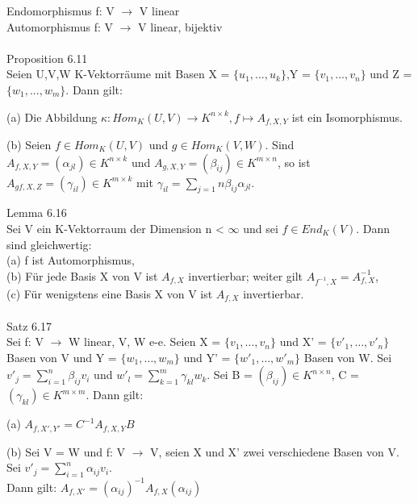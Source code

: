\documentclass[fontsize=10pt]{scrartcl}
\begin{document}
Endomorphismus \hspace*{3.5mm} f: V $\to$ V \hspace*{4mm} linear\\
Automorphismus \hspace*{4mm} f: V $\to$ V \hspace*{4mm} linear, bijektiv\\
\\
Proposition 6.11\\
Seien U,V,W K-Vektorräume mit Basen X = $\{u_1,...,u_k\}$,Y = $\{v_1,...,v_n\}$ und Z = $\{w_1,...,w_m\}$. Dann gilt:
\begin{compactenum}
\item[(a)] Die Abbildung $\kappa: Hom_K(U,V) \to K^{n \times k}, f \mapsto A_{f,X,Y}$ ist ein Isomorphismus.
\item[(b)] Seien $f \in Hom_K(U,V)$ und $g \in Hom_K(V,W)$. Sind $A_{f,X,Y} = (\alpha_{jl}) \in K^{n \times k}$ und $A_{g,X,Y} = (\beta_{ij}) \in K^{m \times n}$, so ist $A_{gf,X,Z} = (\gamma_{il}) \in K^{m \times k}$ mit
$\gamma_{il} = \sum\nolimits_{j=1}{n} \beta_{ij} \alpha_{jl}$.\\
\end{compactenum}
Lemma 6.16\\
Sei V ein K-Vektorraum der Dimension n < $\infty$ und sei $f \in End_K (V)$. Dann sind gleichwertig:\\
(a) f ist Automorphismus,\\
(b) Für jede Basis X von V ist $A_{f,X}$ invertierbar; weiter gilt $A_{f^{-1},X} = A^{-1}_{f,X}$,\\
(c) Für wenigstens eine Basis X von V ist $A_{f,X}$ invertierbar.\\
\\
Satz 6.17\\
Sei f: V $\to$ W linear, V, W e-e. Seien X = $\{v_1, …, v_n\}$ und X' = $\{v'_1, …, v'_n\}$ Basen von V und Y = $\{w_1, …, w_m\}$ und Y' = $\{w'_1, …, w'_m\}$ Basen von W. Sei $v'_j = \sum\nolimits_{i=1}^{n} \beta_{ij} v_i$ und $w'_l = \sum\nolimits_{k=1}^{m} \gamma_{kl} w_k$. Sei B = $(\beta_{ij}) \in K^{n \times n}$, C = $(\gamma_{kl}) \in K^{m \times m}$. Dann gilt:
\begin{compactenum}
\item[(a)] $A_{f, X', Y'} = C^{-1} A_{f, X, Y} B$
\item[(b)] Sei V = W und f: V $\to$ V, seien X und X' zwei verschiedene Basen von V. Sei $v'_j = \sum\nolimits_{i=1}^{n} \alpha_{ij} v_i$.\\
Dann gilt: $A_{f, X'} = (\alpha_{ij})^{-1} A_{f, X} (\alpha_{ij})$\\
\end{compactenum}
\end{document}
